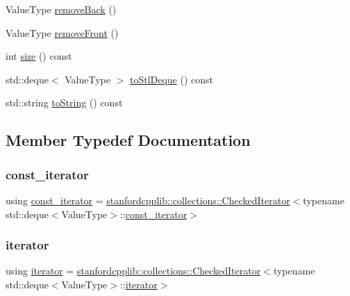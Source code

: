 \begin{DoxyCompactItemize}
\item 
Value\+Type \mbox{\hyperlink{classDeque_af7878e9c2f67e06cbae525e9fa77e38e}{remove\+Back}} ()
\item 
Value\+Type \mbox{\hyperlink{classDeque_a02453aa96e93c38ca4c1d176307c8a63}{remove\+Front}} ()
\item 
int \mbox{\hyperlink{classDeque_af9593d4a5ff4274efaf429cb4f9e57cc}{size}} () const
\item 
std\+::deque$<$ Value\+Type $>$ \mbox{\hyperlink{classDeque_a577546d159bb5d7237f506789f2beafd}{to\+Stl\+Deque}} () const
\item 
std\+::string \mbox{\hyperlink{classDeque_a1fe5121d6528fdea3f243321b3fa3a49}{to\+String}} () const
\end{DoxyCompactItemize}


\subsection{Member Typedef Documentation}
\mbox{\label{classDeque_a82e5b35971ca4096ad8c03687e86f11f}} 
\subsubsection{\texorpdfstring{const\+\_\+iterator}{const\_iterator}}
{\footnotesize\ttfamily using \mbox{\hyperlink{classDeque_a82e5b35971ca4096ad8c03687e86f11f}{const\+\_\+iterator}} =  \mbox{\hyperlink{classstanfordcpplib_1_1collections_1_1CheckedIterator}{stanfordcpplib\+::collections\+::\+Checked\+Iterator}}$<$typename std\+::deque$<$Value\+Type$>$\+::\mbox{\hyperlink{classDeque_a82e5b35971ca4096ad8c03687e86f11f}{const\+\_\+iterator}}$>$}

\mbox{\label{classDeque_af87a5290666b1bb4bf3e44cafc305ad5}} 
\subsubsection{\texorpdfstring{iterator}{iterator}}
{\footnotesize\ttfamily using \mbox{\hyperlink{classDeque_af87a5290666b1bb4bf3e44cafc305ad5}{iterator}} =  \mbox{\hyperlink{classstanfordcpplib_1_1collections_1_1CheckedIterator}{stanfordcpplib\+::collections\+::\+Checked\+Iterator}}$<$typename std\+::deque$<$Value\+Type$>$\+::\mbox{\hyperlink{classDeque_af87a5290666b1bb4bf3e44cafc305ad5}{iterator}}$>$}



